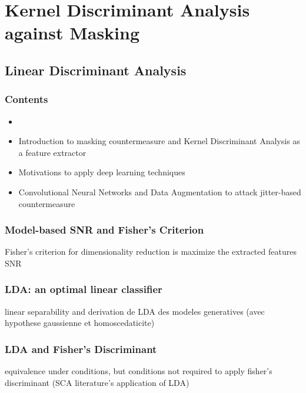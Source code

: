 \section{Kernel Discriminant Analysis against Masking}
\subsection{Linear Discriminant Analysis}

\begin{frame}
\frametitle{Contents}
\begin{itemize}
\item {}
\item Introduction to masking countermeasure and Kernel Discriminant Analysis as a feature extractor
\item Motivations to apply deep learning techniques
\item Convolutional Neural Networks and Data Augmentation to attack jitter-based countermeasure
\end{itemize}
\end{frame}


\begin{frame}
\frametitle{Model-based SNR and Fisher's Criterion}
Fisher's criterion for dimensionality reduction is maximize the extracted features SNR
\end{frame}

\begin{frame}
\frametitle{LDA: an optimal linear classifier}
linear separability and
derivation de LDA des modeles generatives (avec hypothese gaussienne et homoscedaticite)
\end{frame}

\begin{frame}
\frametitle{LDA and Fisher's Discriminant}
equivalence under conditions, but conditions not required to apply fisher's discriminant (SCA literature's application of LDA)
\end{frame}


